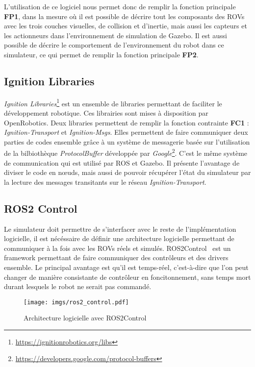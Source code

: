             L'utilisation de ce logiciel nous permet donc de remplir la fonction principale \textbf{FP1}, dans la mesure où il est possible de décrire tout les composants des \gls{ROV}s avec les trois couches visuelles, de collision et d'inertie, mais aussi les capteurs et les actionneurs dans l'environnement de simulation de \gls{Gazebo}. Il est aussi possible de décrire le comportement de l'environnement du robot dans ce simulateur, ce qui permet de remplir la fonction principale \textbf{FP2}.

        \subsection{Ignition Libraries}

            \textit{Ignition Libraries}\footnote{\url{https://ignitionrobotics.org/libs}} est un ensemble de libraries permettant de faciliter le développement robotique. Ces librairies sont mises à disposition par \gls{OpenRobotics}. Deux libraries permettent de remplir la fonction contrainte \textbf{FC1} : \textit{Ignition-Transport} et \textit{Ignition-Msgs}. Elles permettent de faire communiquer deux parties de codes ensemble grâce à un système de messagerie basée sur l'utilisation de la bilbiothèque \textit{ProtocolBuffer} développée par \textit{Google}\footnote{\url{https://developers.google.com/protocol-buffers}}. C'est le même système de communication qui est utilisé par \gls{ROS} et \gls{Gazebo}. Il présente l'avantage de diviser le code en n\oe uds, mais aussi de pouvoir récupérer l'état du simulateur par la lecture des messages transitants sur le réseau \textit{Ignition-Transport}.

        \subsection{ROS2 Control}

            Le simulateur doit permettre de s'interfacer avec le reste de l'implémentation logicielle, il est nécéssaire de définir une architecture logicielle permettant de communiquer à la fois avec les \gls{ROV}s réels et simulés. \gls{ROS2Control}~\cite{ros_control} est un framework permettant de faire communiquer des contrôleurs et des drivers ensemble. Le principal avantage est qu'il est temps-réel, c'est-à-dire que l'on peut changer de manière consistante de contrôleur en foncitonnement, sans temps mort durant lesquels le robot ne serait pas commandé.

            \begin{figure}[!htb]
                \centering
                \texttt{[image: imgs/ros2\_control.pdf]}
                \caption{Architecture logicielle avec \gls{ROS2Control}}
                \label{fig:ros2_control}
            \end{figure}

